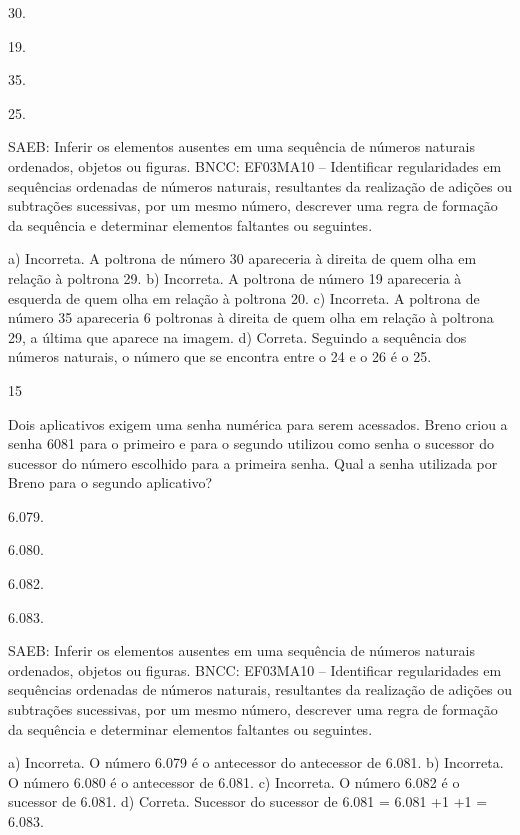 {\begin{escolha}
{\begin{escolha}
\item
  30.
\item
  19.
\item
  35.
\item
  25.
\end{escolha}

SAEB: Inferir os elementos ausentes em uma sequência de
números naturais ordenados, objetos ou figuras.
BNCC: EF03MA10 -- Identificar regularidades em sequências ordenadas de números naturais,
resultantes da realização de adições ou subtrações sucessivas, por um mesmo número,
descrever uma regra de formação da sequência e determinar elementos faltantes ou seguintes.

a) Incorreta. A poltrona de número 30 apareceria à direita de quem olha em relação à poltrona 29.
b) Incorreta. A poltrona de número 19 apareceria à esquerda de quem olha em relação à poltrona 20.
c) Incorreta. A poltrona de número 35 apareceria  6 poltronas à direita de quem olha em relação à poltrona 29, a última que aparece na imagem.
d) Correta. Seguindo a sequência dos números naturais, o número que se encontra entre o 24 e o 26 é o 25.

\num{15}

Dois aplicativos exigem uma senha numérica para serem acessados. Breno criou a senha 6081 para o primeiro e para o segundo utilizou como senha o sucessor do sucessor do número escolhido para a primeira senha. Qual a senha utilizada por Breno para o segundo aplicativo?

\begin{escolha}
\item
  6.079.
\item
  6.080.
\item
  6.082.
\item
  6.083.
\end{escolha}

SAEB: Inferir os elementos ausentes em uma sequência de números naturais ordenados, objetos ou figuras.
BNCC: EF03MA10 -- Identificar regularidades em sequências ordenadas de números naturais,
resultantes da realização de adições ou subtrações sucessivas, por um mesmo número,
descrever uma regra de formação da sequência e determinar elementos faltantes ou seguintes.

a) Incorreta. O número 6.079 é o antecessor do antecessor de 6.081.
b) Incorreta. O número 6.080 é o antecessor de 6.081.
c) Incorreta. O número 6.082 é o sucessor de 6.081.
d) Correta. Sucessor do sucessor de 6.081 = 6.081 +1 +1 = 6.083.

}
\end{escolha}}
